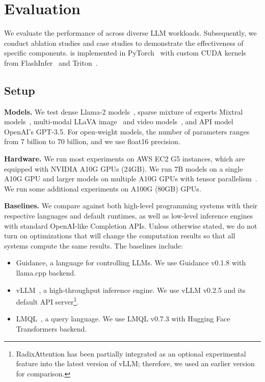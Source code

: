 \section{Evaluation}
\label{sec:eval}

We evaluate the performance of \lang across diverse LLM workloads.
Subsequently, we conduct ablation studies and case studies to demonstrate the effectiveness of specific components.
\lang is implemented in PyTorch~\cite{paszke2019pytorch} with custom CUDA kernels from FlashInfer~\cite{flashinfer} and Triton~\cite{tillet2019triton}.

\subsection{Setup}
\label{subsec:eval-setup}

\noindent \textbf{Models.}
We test dense Llama-2 models~\cite{touvron2023llama2}, sparse mixture of experts Mixtral models~\cite{jiang2024mixtral}, multi-modal LLaVA image~\cite{liu2023improved} and video models~\cite{zhang2024llavanextvideo}, and API model OpenAI's GPT-3.5.
For open-weight models, the number of parameters ranges from 7 billion to 70 billion, and we use float16 precision.

\noindent \textbf{Hardware.}
We run most experiments on AWS EC2 G5 instances, which are equipped with NVIDIA A10G GPUs (24GB). We run 7B models on a single A10G GPU and larger models on multiple A10G GPUs with tensor parallelism~\cite{shoeybi2019megatron}.
We run some additional experiments on A100G (80GB) GPUs. %

\noindent \textbf{Baselines.}
We compare \lang against both high-level programming systems with their respective languages and default runtimes, as well as low-level inference engines with standard OpenAI-like Completion APIs.
Unless otherwise stated, we do not turn on optimizations that will change the computation results so that all systems compute the same results.
The baselines include:
\begin{itemize}
\item Guidance\cite{guidance}, a language for controlling LLMs. We use Guidance v0.1.8 with llama.cpp backend.
\item vLLM~\cite{kwon2023vllm}, a high-throughput inference engine. We use vLLM v0.2.5 and its default API server\footnote{RadixAttention has been partially integrated as an optional experimental feature into the latest version of vLLM; therefore, we used an earlier version for comparison.}.
\item LMQL~\cite{beurer2023lmql}, a query language. We use LMQL v0.7.3 with Hugging Face Transformers backend.
\end{itemize}

